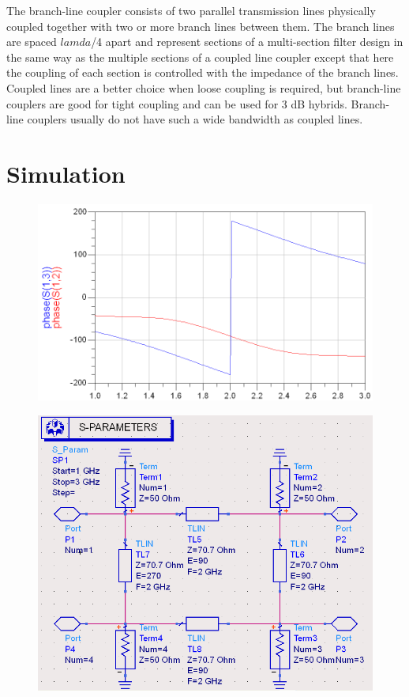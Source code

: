 \documentclass[11pt,a4paper]{report}
\begin{document}
The branch-line coupler consists of two parallel transmission lines physically coupled together with two or more branch lines between them. The branch lines are spaced \(lamda\)/4 apart and represent sections of a multi-section filter design in the same way as the multiple sections of a coupled line coupler except that here the coupling of each section is controlled with the impedance of the branch lines. Coupled lines are a better choice when loose coupling is required, but branch-line couplers are good for tight coupling and can be used for 3 dB hybrids. Branch-line couplers usually do not have such a wide bandwidth as coupled lines. \\

\section*{Simulation}

\begin{figure}
\centuring
\includegraphics[width=0.5\textwodth]{2.3.png}
\caption{}
\end{figure}

\begin{figure}
\centuring
\includegraphics[width=0.5\textwodth]{2.4.png}
\caption{}
\end{figure}
\end{document}
